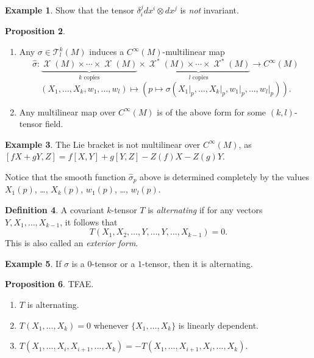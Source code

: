 \documentclass[10pt,letterpaper,cm]{nupset}
\theoremstyle{definition}
\newtheorem{definition}{Definition}[subsection]
\newtheorem{exmp}[definition]{Example}
\theoremstyle{theorem}
\newtheorem{prop}[definition]{Proposition}
\theoremstyle{remark}
\newcommand{\T}{\mathcal T}
\newcommand{\1}{\mathbf{1}}
\newcommand{\0}{\vec 0}
\DeclareMathOperator{\vf}{\mathscr{X}}
\begin{document}
\begin{exmp}
Show that the tensor $\delta_i^j dx^i \otimes dx^j$ is \emph{not} invariant. 
\end{exmp}

\begin{prop} $ $
\begin{enumerate}
\item Any $ \sigma \in \T_l^k(M)$ induces a $C^{\infty}(M)$-multilinear map $$\hat{\sigma} : \underbrace{\vf(M) \times \cdots \times \vf(M)}_{k \text{ copies}} \times \underbrace{\vf^{\ast}(M) \times \cdots \times \vf^{\ast}(M)}_{l \text{ copies}}\to C^{\infty}(M)$$  $$\left(X_1, \ldots, X_k, w_1, \ldots, w_l\right)\mapsto \left(p \mapsto \sigma \left(X_1\bigr\rvert_p, \ldots, X_k\bigr\rvert_p, w_1\bigr\rvert_p, \ldots, w_l\bigr\rvert_p\right)\right).$$
\item Any multilinear map over $C^{\infty}(M)$ is of the above form for some $(k,l)$-tensor field.
\end{enumerate}
\end{prop}

\begin{exmp}
The Lie bracket is not multilinear over $C^{\infty}(M)$, as $[fX + gY, Z] = f[X, Y] + g[Y, Z]-Z(f)X -Z(g)Y$.
\end{exmp}


Notice that the smooth function $\hat{\sigma}_p$ above is determined completely by  the values $X_1(p)$, \ldots, $X_k(p)$, $w_1(p)$, \ldots, $w_l(p)$.

\begin{definition}
A covariant $k$-tensor $T$ is \textit{alternating}  if for any vectors $Y, X_1, \ldots, X_{k-1}$, it follows that $$T(X_1, X_2, \ldots, Y, \ldots, Y, \ldots, X_{k-1}) =0.$$ This is also called an \textit{exterior form}.
\end{definition}

\begin{exmp}
If $\sigma$ is a $0$-tensor or a $1$-tensor, then it is alternating.
\end{exmp}

\begin{prop} TFAE.
\begin{enumerate}
\item $T$ is alternating.
\item $T(X_1, \ldots, X_k) =0$ whenever $\{X_1, \ldots,  X_k\}$ is linearly dependent.
\item $T(X_1, \ldots, X_i, X_{i+1}, \ldots, X_k) = {-}T(X_1, \ldots, X_{i+1}, X_{i}, \ldots, X_k)$.
\end{enumerate}
\end{prop}
\end{document}
